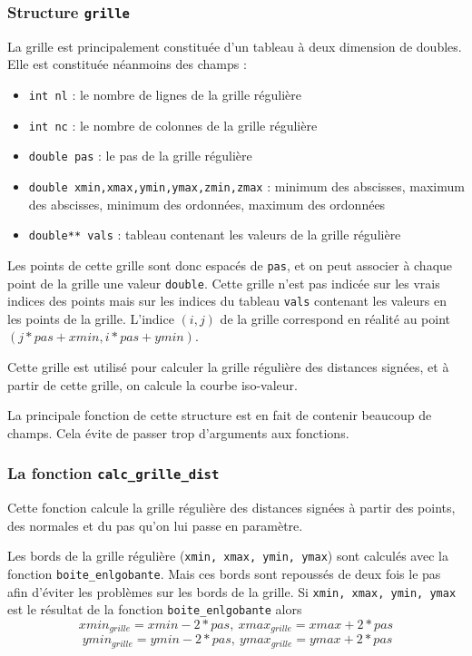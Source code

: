 \documentclass[11pt,a4paper]{article}
\begin{document}
\subsubsection{Structure {\tt grille}}
La grille est principalement constituée d'un tableau à deux dimension de doubles. Elle est constituée néanmoins des champs :
\begin{itemize}
\item {\tt int nl} : le nombre de lignes de la grille régulière
\item {\tt int nc} : le nombre de colonnes de la grille régulière
\item {\tt double pas} : le pas de la grille régulière
\item {\tt double xmin,xmax,ymin,ymax,zmin,zmax} : minimum des abscisses, maximum des abscisses, minimum des ordonnées, maximum des ordonnées
\item {\tt double** vals} : tableau contenant les valeurs de la grille régulière
\end{itemize}

Les points de cette grille sont donc espacés de {\tt pas}, et on peut associer à chaque point de la grille une valeur {\tt double}.
Cette grille n'est pas indicée sur les vrais indices des points mais sur les indices du tableau {\tt vals} contenant les valeurs en les points
de la grille. L'indice $(i,j)$ de la grille correspond en réalité au point $(j*pas+xmin,i*pas+ymin)$.

Cette grille est utilisé pour calculer la grille régulière des distances signées, et à partir de cette grille, on calcule la courbe iso-valeur.

La principale fonction de cette structure est en fait de contenir beaucoup de champs.
Cela évite de passer trop d'arguments aux fonctions.

\subsubsection{La fonction {\tt calc\_grille\_dist}}
Cette fonction calcule la grille régulière des distances signées à partir des points, des normales et du pas qu'on lui passe en paramètre.

Les bords de la grille régulière ({\tt xmin, xmax, ymin, ymax}) sont calculés avec la fonction {\tt boite\_enlgobante}. Mais ces bords sont
repoussés de deux fois le pas afin d'éviter les problèmes sur les bords de la grille. Si {\tt xmin, xmax, ymin, ymax} est le résultat de
la fonction {\tt boite\_enlgobante} alors $$xmin_{grille}=xmin-2*pas,~xmax_{grille}=xmax+2*pas$$
$$~ymin_{grille}=ymin-2*pas,~ ymax_{grille}=ymax+2*pas $$
\end{document}
